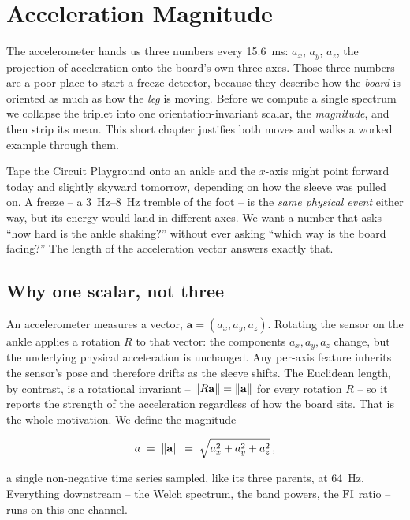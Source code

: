 \section{Acceleration Magnitude}
\label{sec:magnitude}

The accelerometer hands us three numbers every \SI{15.6}{ms}: $a_x$, $a_y$, $a_z$,
the projection of acceleration onto the board's own three axes. Those three numbers
are a poor place to start a freeze detector, because they describe how the
\emph{board} is oriented as much as how the \emph{leg} is moving. Before we compute a
single spectrum we collapse the triplet into one orientation-invariant scalar, the
\emph{magnitude}, and then strip its mean. This short chapter justifies both moves and
walks a worked example through them.

\begin{intuition}
Tape the Circuit Playground onto an ankle and the $x$-axis might point forward today
and slightly skyward tomorrow, depending on how the sleeve was pulled on. A freeze --
a \SIrange{3}{8}{Hz} tremble of the foot -- is the \emph{same physical event} either
way, but its energy would land in different axes. We want a number that asks ``how
hard is the ankle shaking?'' without ever asking ``which way is the board facing?''
The length of the acceleration vector answers exactly that.
\end{intuition}

\subsection{Why one scalar, not three}

An accelerometer measures a vector, $\mathbf{a}=(a_x,a_y,a_z)$. Rotating the sensor
on the ankle applies a rotation $R$ to that vector: the components $a_x,a_y,a_z$
change, but the underlying physical acceleration is unchanged. Any per-axis feature
inherits the sensor's pose and therefore drifts as the sleeve shifts. The Euclidean
length, by contrast, is a rotational invariant -- $\lVert R\mathbf{a} \rVert=\lVert \mathbf{a} \rVert$
for every rotation $R$ -- so it reports the strength of the acceleration regardless of
how the board sits. That is the whole motivation. We define the magnitude

\begin{equation}
a \;=\; \lVert \mathbf{a} \rVert \;=\; \sqrt{a_x^{2}+a_y^{2}+a_z^{2}}\,,
\label{eq:mag}
\end{equation}

a single non-negative time series sampled, like its three parents, at
\SI{64}{Hz}. Everything downstream -- the Welch spectrum, the band powers, the
$\mathrm{FI}$ ratio -- runs on this one channel.

